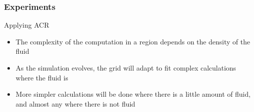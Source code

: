 \documentclass{beamer}\usetheme{Madrid} %
\begin{document}
\begin{frame}
\frametitle { Experiments } Applying ACR
\begin{itemize}
	\item
		The complexity of the computation in a region depends on
		the density of the fluid
	\item
		As the simulation evolves, the grid will adapt to fit complex
		calculations where the fluid is
	\item
		More simpler calculations will be done where there is a little
		amount of fluid, and almost any where there is not fluid
\end{itemize}
\end{frame}
\end{document}
